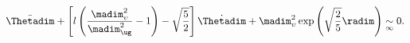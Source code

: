 \begin{equation}
\label{eq:evolthetaconst}
\ddot{\Thetadim} + \left[
l\left(\dfrac{\madim_\upsilon^2}{\madim_\ug^2} - 1 \right) -
\sqrt{\dfrac{5}{2}} \right] \dot{\Thetadim} + \madim_\upsilon^2
\exp{\left(\sqrt{\dfrac{2}{5}} \radim \right)} \underset{\infty}{\sim}
0.
\end{equation}


